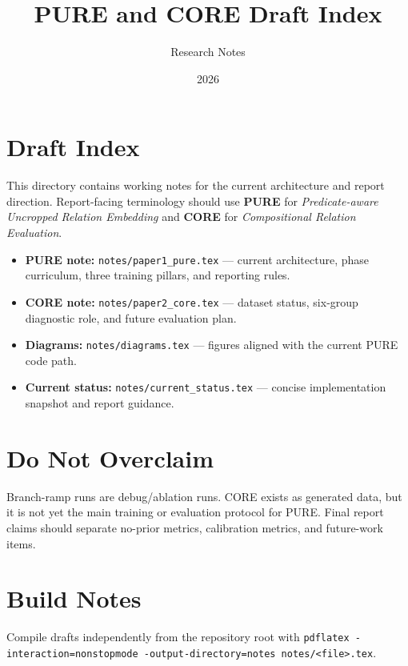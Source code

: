 \documentclass{article}
\title{PURE and CORE Draft Index}
\author{Research Notes}
\date{2026}
\begin{document}
\maketitle

\section*{Draft Index}
This directory contains working notes for the current architecture and report direction. Report-facing terminology should use \textbf{PURE} for \emph{Predicate-aware Uncropped Relation Embedding} and \textbf{CORE} for \emph{Compositional Relation Evaluation}.

\begin{itemize}
  \item \textbf{PURE note:} \texttt{notes/paper1\_pure.tex} --- current architecture, phase curriculum, three training pillars, and reporting rules.
  \item \textbf{CORE note:} \texttt{notes/paper2\_core.tex} --- dataset status, six-group diagnostic role, and future evaluation plan.
  \item \textbf{Diagrams:} \texttt{notes/diagrams.tex} --- figures aligned with the current PURE code path.
  \item \textbf{Current status:} \texttt{notes/current\_status.tex} --- concise implementation snapshot and report guidance.
\end{itemize}

\section*{Do Not Overclaim}
Branch-ramp runs are debug/ablation runs. CORE exists as generated data, but it is not yet the main training or evaluation protocol for PURE. Final report claims should separate no-prior metrics, calibration metrics, and future-work items.

\section*{Build Notes}
Compile drafts independently from the repository root with \texttt{pdflatex -interaction=nonstopmode -output-directory=notes notes/<file>.tex}.
\end{document}
